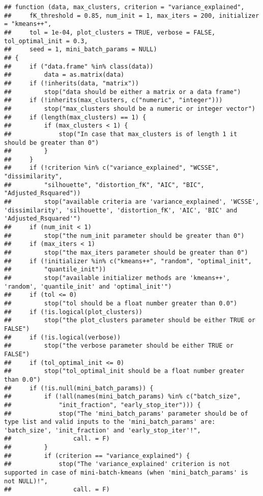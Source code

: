 \documentclass[
]{article}
\begin{document}
\begin{verbatim}
## function (data, max_clusters, criterion = "variance_explained", 
##     fK_threshold = 0.85, num_init = 1, max_iters = 200, initializer = "kmeans++", 
##     tol = 1e-04, plot_clusters = TRUE, verbose = FALSE, tol_optimal_init = 0.3, 
##     seed = 1, mini_batch_params = NULL) 
## {
##     if ("data.frame" %in% class(data)) 
##         data = as.matrix(data)
##     if (!inherits(data, "matrix")) 
##         stop("data should be either a matrix or a data frame")
##     if (!inherits(max_clusters, c("numeric", "integer"))) 
##         stop("max_clusters should be a numeric or integer vector")
##     if (length(max_clusters) == 1) {
##         if (max_clusters < 1) {
##             stop("In case that max_clusters is of length 1 it should be greater than 0")
##         }
##     }
##     if (!criterion %in% c("variance_explained", "WCSSE", "dissimilarity", 
##         "silhouette", "distortion_fK", "AIC", "BIC", "Adjusted_Rsquared")) 
##         stop("available criteria are 'variance_explained', 'WCSSE', 'dissimilarity', 'silhouette', 'distortion_fK', 'AIC', 'BIC' and 'Adjusted_Rsquared'")
##     if (num_init < 1) 
##         stop("the num_init parameter should be greater than 0")
##     if (max_iters < 1) 
##         stop("the max_iters parameter should be greater than 0")
##     if (!initializer %in% c("kmeans++", "random", "optimal_init", 
##         "quantile_init")) 
##         stop("available initializer methods are 'kmeans++', 'random', 'quantile_init' and 'optimal_init'")
##     if (tol <= 0) 
##         stop("tol should be a float number greater than 0.0")
##     if (!is.logical(plot_clusters)) 
##         stop("the plot_clusters parameter should be either TRUE or FALSE")
##     if (!is.logical(verbose)) 
##         stop("the verbose parameter should be either TRUE or FALSE")
##     if (tol_optimal_init <= 0) 
##         stop("tol_optimal_init should be a float number greater than 0.0")
##     if (!is.null(mini_batch_params)) {
##         if (!all(names(mini_batch_params) %in% c("batch_size", 
##             "init_fraction", "early_stop_iter"))) {
##             stop("The 'mini_batch_params' parameter should be of type list and valid inputs to the 'mini_batch_params' are: 'batch_size', 'init_fraction' and 'early_stop_iter'!", 
##                 call. = F)
##         }
##         if (criterion == "variance_explained") {
##             stop("The 'variance_explained' criterion is not supported in case of mini-batch-kmeans (when 'mini_batch_params' is not NULL)!", 
##                 call. = F)

\end{verbatim}
\end{document}
